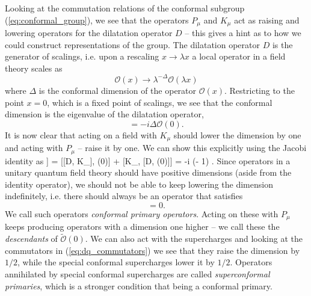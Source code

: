 Looking at the commutation relations of the conformal subgroup (\ref{eq:conformal_group}), we see that the operators $P_\mu$ and $K_\mu$ act as raising and lowering operators for the dilatation operator $D$ -- this gives a hint as to how we could construct representations of the group. 
The dilatation operator $D$ is the generator of scalings, i.e. upon a rescaling $x \rightarrow \lambda x$ a local operator in a field theory scales as 
\begin{equation}
	\mathcal{O}(x) \rightarrow \lambda^{-\Delta} \mathcal{O}(\lambda x)
\end{equation}
where $\Delta$ is the conformal dimension of the operator $\mathcal{O}(x)$. 
Restricting to the point $x = 0$, which is a fixed point of scalings, we see that the conformal dimension is the eigenvalue of the dilatation operator,
\begin{equation}
	[D,\mathcal{O}(0)] = -i \Delta \mathcal{O}(0).
\end{equation}
It is now clear that acting on a field with $K_\mu$ should lower the dimension by one and acting with $P_\mu$ -- raise it by one. 
We can show this explicitly using the Jacobi identity as
\beq
	[D, [K_\mu, \mathcal{O}(0)]] = [[D, K_\mu], (0)] + [K_\mu, [D, (0)]] = -i (\Delta - 1) \; [K_\mu, \mathcal{O}(0)].
\eeq
Since operators in a unitary quantum field theory should have positive dimensions (aside from the identity operator), we should not be able to keep lowering the dimension indefinitely, i.e. there should always be an operator that satisfies
\begin{equation}
	[K_\mu, \tilde{\mathcal{O}}(0)] = 0.
\end{equation} 
We call such operators \emph{conformal primary operators}. 
Acting on these with $P_\mu$ keeps producing operators with a dimension one higher -- we call these the \emph{descendants} of $\tilde{\mathcal{O}}(0)$. 
We can also act with the supercharges and looking at the commutators in (\ref{eq:dq_commutators}) we see that they raise the dimension by $1/2$, while the special conformal supercharges lower it by $1/2$. 
Operators annihilated by special conformal supercharges are called \emph{superconformal primaries}, which is a stronger condition that being a conformal primary.

